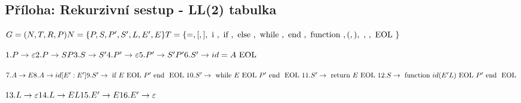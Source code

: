 \documentclass[12pt,a4paper,titlepage,final]{article}
\begin{document}
\begin{landscape} %
\section{Příloha: Rekurzivní sestup - LL(2) tabulka} \label{rekurzivnisestup}

\begin{minipage}{\linewidth} %
\begin{large}

\begin{math}
G = (N,T,R,P) \\
N = \{ P, S, P', S', L, E', E \} \\
T = \{ =, [, ], \text{ i }, \text{ if }, \text{ else }, \text{ while }, \text{ end }, \text{ function }, (, ), \text{ , }, \text{ EOL } \} \\
\end{math}

\begin{minipage}{0.2\linewidth}
\begin{math}
1.  P  \rightarrow \varepsilon \\
2.  P  \rightarrow SP \\
3.  S  \rightarrow S' \\
4.  P' \rightarrow \varepsilon \\
5.  P' \rightarrow S'P' \\
6.  S' \rightarrow id = A \text{ EOL } \\
\end{math}
\end{minipage}
\begin{minipage}{0.42\linewidth}
\begin{math}
7.  A \rightarrow E \\
8.  A \rightarrow id[E':E'] \\
9.  S' \rightarrow \text{ if } E \text{ EOL } P' \text{ end } \text{ EOL } \\
10. S' \rightarrow \text{ while } E \text{ EOL } P' \text{ end } \text{ EOL } \\
11. S' \rightarrow \text{ return } E \text{ EOL } \\
12. S  \rightarrow \text{ function } id ( E' L ) \text{ EOL } P' \text{ end } \text{ EOL } \\
\end{math}
\end{minipage}
\begin{minipage}{0.4\linewidth}
\begin{math}
13. L  \rightarrow \varepsilon \\
14. L  \rightarrow E L \\
15. E' \rightarrow E \\
16. E' \rightarrow \varepsilon \\
\\ \\
\end{math}
\end{minipage}


\end{large}
\end{minipage}
\end{landscape}
\end{document}
